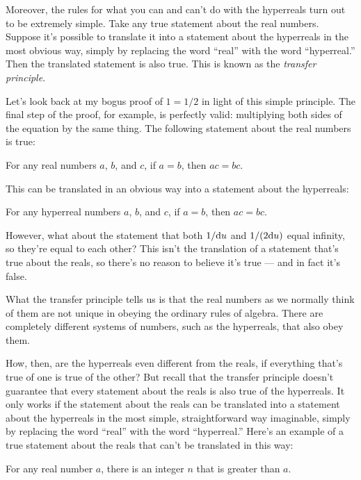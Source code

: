 Moreover, the
rules for what you can and can't do with the hyperreals turn out to be extremely simple. 
Take any true statement about the real numbers. Suppose it's possible to translate it into a statement about
the hyperreals in the most obvious way, simply by replacing the word ``real'' with the word ``hyperreal.''
Then the translated statement is also true. This is known as the \emph{transfer principle}.

Let's look back at my bogus proof of $1=1/2$ in light of this simple principle. The final step of the proof,
for example, is perfectly valid: multiplying both sides of the equation by the same thing. The following
statement about the real numbers is true:

\begin{indentedblock}
For any real numbers $a$, $b$, and $c$, if $a=b$, then $ac=bc$.
\end{indentedblock}

This can be translated in an obvious way into a statement about the hyperreals:

\begin{indentedblock}
For any hyperreal numbers $a$, $b$, and $c$, if $a=b$, then $ac=bc$.
\end{indentedblock}

However, what about the statement that both $1/\textup{d} u$ and $1/(2\textup{d} u)$ equal infinity, so they're
equal to each other? This isn't the translation of a statement that's true about the reals, so there's
no reason to believe it's true --- and in fact it's false.

What the transfer principle tells us is that the real numbers as we normally
think of them are not unique in obeying the ordinary rules of algebra. There are completely different
systems of numbers, such as the hyperreals, that also obey them.

How, then, are the hyperreals even
different from the reals, if everything that's true of one is true of the other? But recall that
the transfer principle doesn't guarantee that every statement about the reals is also true of the
hyperreals. It only works if the statement about the reals can be translated into a statement
about the hyperreals in the most simple, straightforward way imaginable, simply by replacing
the word ``real'' with the word ``hyperreal.'' Here's an example of a true statement about the reals that
can't be translated in this way:

\begin{indentedblock}
For any real number $a$, there is an integer $n$ that is greater than $a$.
\end{indentedblock}

